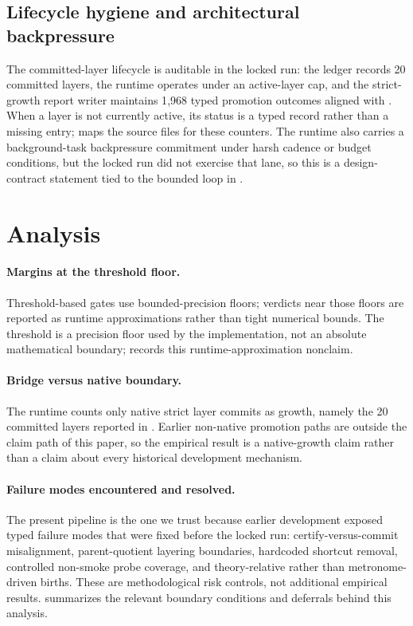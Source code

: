 \documentclass{article}
\theoremstyle{definition}
\begin{document}
\subsection{Lifecycle hygiene and architectural backpressure}\label{subsec:lifecycle-and-backpressure}

The committed-layer lifecycle is auditable in the locked run: the ledger records 20 committed layers, the runtime operates under an active-layer cap, and the strict-growth report writer maintains 1{,}968 typed promotion outcomes aligned with . When a layer is not currently active, its status is a typed record rather than a missing entry;  maps the source files for these counters. The runtime also carries a background-task backpressure commitment under harsh cadence or budget conditions, but the locked run did not exercise that lane, so this is a design-contract statement tied to the bounded loop in .
 \section{Analysis}\label{sec:analysis}

\paragraph{Margins at the threshold floor.}\label{subsec:margin-tightness}
Threshold-based gates use bounded-precision floors; verdicts near those floors are reported as runtime approximations rather than tight numerical bounds. The threshold is a precision floor used by the implementation, not an absolute mathematical boundary;  records this runtime-approximation nonclaim.

\paragraph{Bridge versus native boundary.}\label{subsec:bridge-native}
The runtime counts only native strict layer commits as growth, namely the 20 committed layers reported in . Earlier non-native promotion paths are outside the claim path of this paper, so the empirical result is a native-growth claim rather than a claim about every historical development mechanism.

\paragraph{Failure modes encountered and resolved.}\label{subsec:failure-modes}
The present pipeline is the one we trust because earlier development exposed typed failure modes that were fixed before the locked run: certify-versus-commit misalignment, parent-quotient layering boundaries, hardcoded shortcut removal, controlled non-smoke probe coverage, and theory-relative rather than metronome-driven births. These are methodological risk controls, not additional empirical results.  summarizes the relevant boundary conditions and deferrals behind this analysis.
\end{document}
